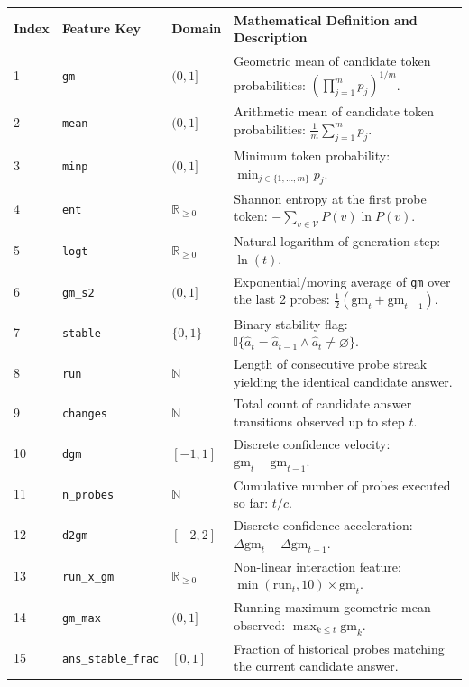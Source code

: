 \documentclass[11pt]{article}
\newcommand{\I}{\mathbb{I}}
\begin{document}
\begin{table}[ht]
\centering
\small
\begin{tabularx}{\linewidth}{lllX}
\toprule
\textbf{Index} & \textbf{Feature Key} & \textbf{Domain} & \textbf{Mathematical Definition and Description} \\
\midrule
1 & \texttt{gm} & $(0, 1]$ & Geometric mean of candidate token probabilities: $\left(\prod_{j=1}^m p_j\right)^{1/m}$. \\
2 & \texttt{mean} & $(0, 1]$ & Arithmetic mean of candidate token probabilities: $\frac{1}{m}\sum_{j=1}^m p_j$. \\
3 & \texttt{minp} & $(0, 1]$ & Minimum token probability: $\min_{j \in \{1,\dots,m\}} p_j$. \\
4 & \texttt{ent} & $\mathbb{R}_{\ge 0}$ & Shannon entropy at the first probe token: $-\sum_{v \in \mathcal{V}} P(v)\ln P(v)$. \\
5 & \texttt{logt} & $\mathbb{R}_{\ge 0}$ & Natural logarithm of generation step: $\ln(t)$. \\
6 & \texttt{gm\_s2} & $(0, 1]$ & Exponential/moving average of \texttt{gm} over the last 2 probes: $\frac{1}{2}(\mathrm{gm}_t + \mathrm{gm}_{t-1})$. \\
7 & \texttt{stable} & $\{0, 1\}$ & Binary stability flag: $\I\{\hat{a}_t = \hat{a}_{t-1} \land \hat{a}_t \neq \varnothing\}$. \\
8 & \texttt{run} & $\mathbb{N}$ & Length of consecutive probe streak yielding the identical candidate answer. \\
9 & \texttt{changes} & $\mathbb{N}$ & Total count of candidate answer transitions observed up to step $t$. \\
10 & \texttt{dgm} & $[-1, 1]$ & Discrete confidence velocity: $\mathrm{gm}_t - \mathrm{gm}_{t-1}$. \\
11 & \texttt{n\_probes} & $\mathbb{N}$ & Cumulative number of probes executed so far: $t / c$. \\
12 & \texttt{d2gm} & $[-2, 2]$ & Discrete confidence acceleration: $\Delta \mathrm{gm}_t - \Delta \mathrm{gm}_{t-1}$. \\
13 & \texttt{run\_x\_gm} & $\mathbb{R}_{\ge 0}$ & Non-linear interaction feature: $\min(\mathrm{run}_t, 10) \times \mathrm{gm}_t$. \\
14 & \texttt{gm\_max} & $(0, 1]$ & Running maximum geometric mean observed: $\max_{k \le t} \mathrm{gm}_k$. \\
15 & \texttt{ans\_stable\_frac} & $[0, 1]$ & Fraction of historical probes matching the current candidate answer. \\

\end{tabularx}
\end{table}
\end{document}
